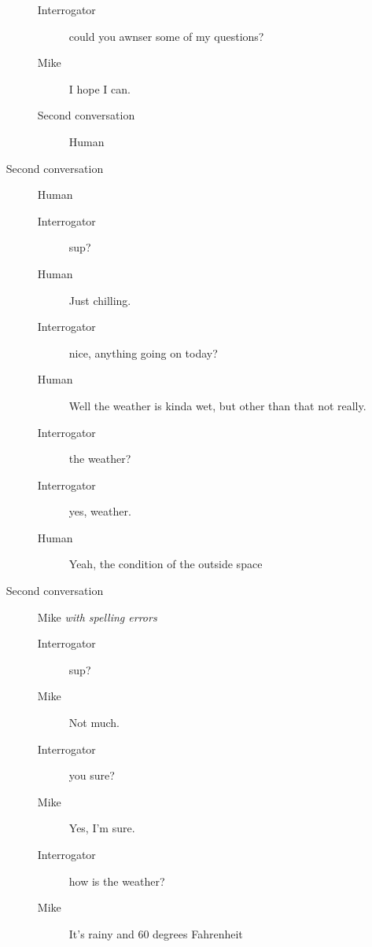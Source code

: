 \begin{itemize}
\begin{description}
\begin{description}
               \item [Interrogator] could you awnser some of my questions?
               \item [Mike] I hope I can.
               \item [Second conversation] Human
            \end{description}
         \item [Second conversation] Human
            \begin{description}
               \item [Interrogator] sup?
               \item [Human] Just chilling.
               \item [Interrogator] nice, anything going on today?
               \item [Human] Well the weather is kinda wet, but other than that not really.
               \item [Interrogator] the weather?
               \item [Interrogator] yes, weather.
               \item [Human] Yeah, the condition of the outside space
            \end{description}
         \item [Second conversation] Mike \textit{with spelling errors}
            \begin{description}
               \item [Interrogator] sup?
               \item [Mike] Not much.
               \item [Interrogator] you sure?
               \item [Mike] Yes, I’m sure.
               \item [Interrogator] how is the weather?
               \item [Mike] It's rainy and 60 degrees Fahrenheit
            \end{description}
      \end{description}


\end{itemize}
